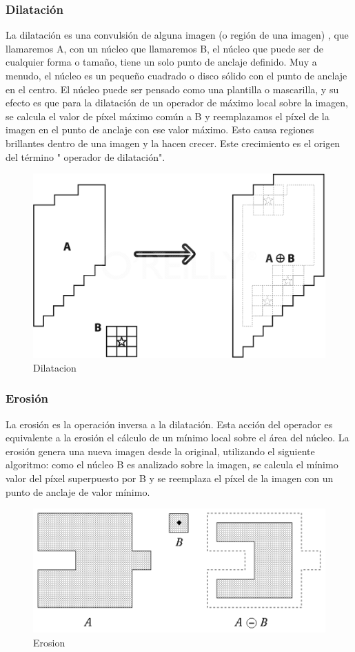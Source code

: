 \subsubsection{Dilatación}
La dilatación es una convulsión de alguna imagen (o región de una imagen) , que llamaremos A, con un núcleo que llamaremos B,
el núcleo que puede ser de cualquier forma o tamaño, tiene un solo punto de anclaje definido. Muy  a menudo, el núcleo es un
pequeño cuadrado o disco sólido con el punto de anclaje en el centro. El núcleo puede ser pensado como una plantilla  o
mascarilla, y su efecto es que para la dilatación de un operador de máximo local sobre la imagen, se calcula el valor de píxel
máximo común a B y reemplazamos el píxel de la imagen en el punto de anclaje con ese valor máximo. Esto causa regiones brillantes
dentro de una imagen y la hacen crecer. Este crecimiento es el origen del término " operador de dilatación". \cite{BookOpenCv}

\begin{figure}[hbtp]
\caption{Dilatacion}
\centering
\includegraphics[scale=0.3]{imagenes/erosion-model.png}
\end{figure}


\subsubsection{Erosión}
La erosión es la operación inversa a la dilatación. Esta acción del operador es equivalente a la erosión el cálculo de un mínimo
local sobre el área del núcleo. La erosión genera una nueva imagen desde la original, utilizando el siguiente algoritmo: como el
núcleo B es analizado sobre la imagen, se calcula el mínimo valor del píxel superpuesto por B y se reemplaza el píxel de la
imagen con un punto de anclaje de valor mínimo. \cite{BookOpenCv}

\begin{figure}[hbtp]
\caption{Erosion}
\centering
\includegraphics[scale=1]{imagenes/erosion.png}
\end{figure}
